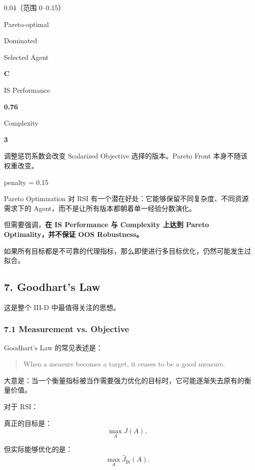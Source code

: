 0.04（范围 0--0.15）


Pareto-optimal

Dominated

Selected Agent

\textbf{C}

IS Performance

\textbf{0.76}

Complexity

\textbf{3}

调整惩罚系数会改变 Scalarized Objective 选择的版本。Pareto Front 本身不随该权重改变。

penalty = 0.15


Pareto Optimization 对 RSI 有一个潜在好处：它能够保留不同复杂度、不同资源需求下的 Agent，而不是让所有版本都朝着单一经验分数演化。

但需要强调，\textbf{在 IS Performance 与 Complexity 上达到 Pareto Optimality，并不保证 OOS Robustness。}

如果所有目标都是不可靠的代理指标，那么即使进行多目标优化，仍然可能发生过拟合。

\hypertarget{part-3-40-0001-goodharts-law}{%
\subsection{7. Goodhart's Law}\label{part-3-40-0001-goodharts-law}}

这是整个 III-D 中最值得关注的思想。

\hypertarget{part-3-40-0001-measurement-vs.-objective}{%
\subsubsection{7.1 Measurement vs. Objective}\label{part-3-40-0001-measurement-vs.-objective}}

Goodhart's Law 的常见表述是：

\begin{quote}
When a measure becomes a target, it ceases to be a good measure.
\end{quote}

大意是：当一个衡量指标被当作需要强力优化的目标时，它可能逐渐失去原有的衡量价值。

对于 RSI：

真正的目标是：
\[\max_A J(A),\]

但实际能够优化的是：
\[\max_A\widehat J_{\mathrm{IS}}(A).\]

